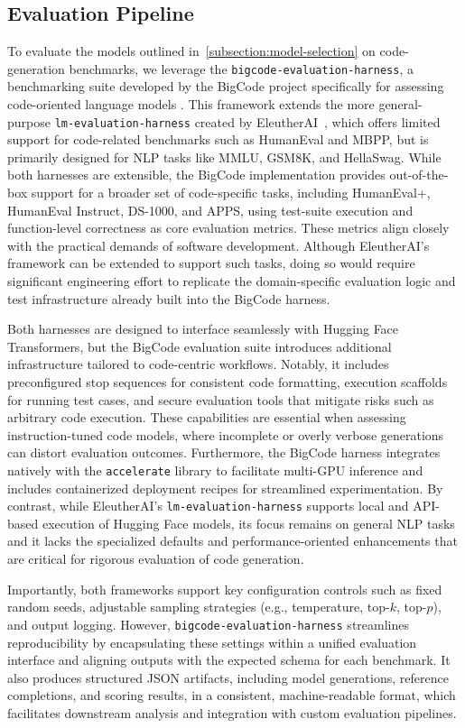\subsection{Evaluation Pipeline}
\label{sec:pipeline}

To evaluate the models outlined in~\ref{subsection:model-selection} on code-generation benchmarks, we leverage the \texttt{bigcode-evaluation-harness}, a benchmarking suite developed by the BigCode project specifically for assessing code-oriented language models \autocite{Bigcode}. This framework extends the more general-purpose \texttt{lm-evaluation-harness} created by EleutherAI~\autocite{EleutherAI}, which offers limited support for code-related benchmarks such as HumanEval and MBPP, but is primarily designed for \gls{NLP} tasks like MMLU, GSM8K, and HellaSwag. While both harnesses are extensible, the BigCode implementation provides out-of-the-box support for a broader set of code-specific tasks, including HumanEval+, HumanEval Instruct, DS-1000, and APPS, using test-suite execution and function-level correctness as core evaluation metrics. These metrics align closely with the practical demands of software development. Although EleutherAI’s framework can be extended to support such tasks, doing so would require significant engineering effort to replicate the domain-specific evaluation logic and test infrastructure already built into the BigCode harness.

Both harnesses are designed to interface seamlessly with Hugging Face Transformers, but the BigCode evaluation suite introduces additional infrastructure tailored to code-centric workflows. Notably, it includes preconfigured stop sequences for consistent code formatting, execution scaffolds for running test cases, and secure evaluation tools that mitigate risks such as arbitrary code execution. These capabilities are essential when assessing instruction-tuned code models, where incomplete or overly verbose generations can distort evaluation outcomes. Furthermore, the BigCode harness integrates natively with the \texttt{accelerate} library to facilitate multi-GPU inference and includes containerized deployment recipes for streamlined experimentation. By contrast, while EleutherAI’s \texttt{lm-evaluation-harness} supports local and API-based execution of Hugging Face models, its focus remains on general \gls{NLP} tasks and it lacks the specialized defaults and performance-oriented enhancements that are critical for rigorous evaluation of code generation.

Importantly, both frameworks support key configuration controls such as fixed random seeds, adjustable sampling strategies (e.g., temperature, top-$k$, top-$p$), and output logging. However, \texttt{bigcode-evaluation-harness} streamlines reproducibility by encapsulating these settings within a unified evaluation interface and aligning outputs with the expected schema for each benchmark. It also produces structured JSON artifacts, including model generations, reference completions, and scoring results, in a consistent, machine-readable format, which facilitates downstream analysis and integration with custom evaluation pipelines.

